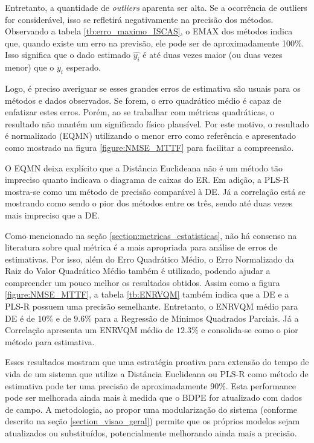 Entretanto, a quantidade de \textit{outliers} aparenta ser alta. Se a ocorrência de outliers for considerável, isso se refletirá negativamente na precisão dos métodos. Observando a tabela \ref{tb:erro_maximo_ISCAS}, o EMAX dos métodos indica que, quando existe um erro na previsão, ele pode ser de aproximadamente 100\%. Isso significa que o dado estimado $\hat{y_i}$ é até duas vezes maior (ou duas vezes menor) que o ${y_i}$ esperado.

Logo, é preciso averiguar se esses grandes erros de estimativa são usuais para os métodos e dados observados. Se forem, o erro quadrático médio é capaz de enfatizar estes erros. Porém, ao se trabalhar com métricas quadráticas, o resultado não mantém um significado físico plausível. Por este motivo, o resultado é normalizado (EQMN) utilizando o menor erro como referência e apresentado como mostrado na figura \ref{figure:NMSE_MTTF} para facilitar a compreensão.

O EQMN deixa explícito que a Distância Euclideana não é um método tão impreciso quanto indicava o diagrama de caixas do ER. Em adição, a PLS-R mostra-se como um método de precisão comparável à DE. Já a correlação está se mostrando como sendo o pior dos métodos entre os três, sendo até duas vezes mais impreciso que a DE.

Como mencionado na seção \ref{section:metricas_estatisticas}, não há consenso na literatura sobre qual métrica é a mais apropriada para análise de erros de estimativas. Por isso, além do Erro Quadrático Médio, o Erro Normalizado da Raiz do Valor Quadrático Médio também é utilizado, podendo ajudar a compreender um pouco melhor os resultados obtidos. Assim como a figura \ref{figure:NMSE_MTTF}, a tabela \ref{tb:ENRVQM} também indica que a DE e a PLS-R possuem uma precisão semelhante. Entretanto, o ENRVQM médio para DE é de $10\%$ e de $9.6\%$ para a Regressão de Mínimos Quadrados Parciais. Já a Correlação apresenta um ENRVQM médio de $12.3\%$ e consolida-se como o pior método para estimativa.

Esses resultados mostram que uma estratégia proativa para extensão do tempo de vida de um sistema que utilize a Distância Euclideana ou PLS-R como método de estimativa pode ter uma precisão de aproximadamente 90\%. Esta performance pode ser melhorada ainda mais à medida que o BDPE for atualizado com dados de campo. A metodologia, ao propor uma modularização do sistema (conforme descrito na seção \ref{section_visao_geral}) permite que os próprios modelos sejam atualizados ou substituídos, potencialmente melhorando ainda mais a precisão.

